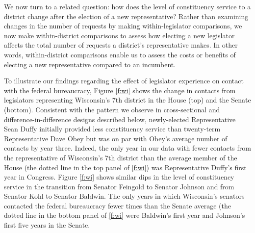 \documentclass[12pt]{article}
\begin{document}

We now turn to a related question: how does the level of constituency service to a district change after the election of a new representative? Rather than examining changes in the number of requests by making within-legislator comparisons, we now make within-district comparisons to assess how electing a new legislator affects the total number of requests a district's representative makes. In other words, within-district comparisons enable us to assess the costs or benefits of electing a new representative compared to an incumbent.%


To illustrate our findings regarding the effect of legislator experience on contact with the federal bureaucracy, Figure \ref{f:wi} shows the change in contacts from legislators representing Wisconsin's 7th district in the House (top) and the Senate (bottom). 
Consistent with the pattern we observe in cross-sectional and difference-in-difference designs described below, newly-elected Representative Sean Duffy initially provided less constituency service than twenty-term Representative Dave Obey but was on par with Obey's average number of contacts by year three. Indeed, the only year in our data with fewer contacts from the representative of Wisconsin's 7th district than the average member of the House (the dotted line in the top panel of \ref{f:wi}) was Representative Duffy's first year in Congress. Figure \ref{f:wi} shows similar dips in the level of constituency service in the transition from Senator Feingold to Senator Johnson and from Senator Kohl to Senator Baldwin. The only years in which Wisconsin's senators contacted the federal bureaucracy fewer times than the Senate average (the dotted line in the bottom panel of \ref{f:wi} were Baldwin's first year and Johnson's first five years in the Senate. 
\end{document}
